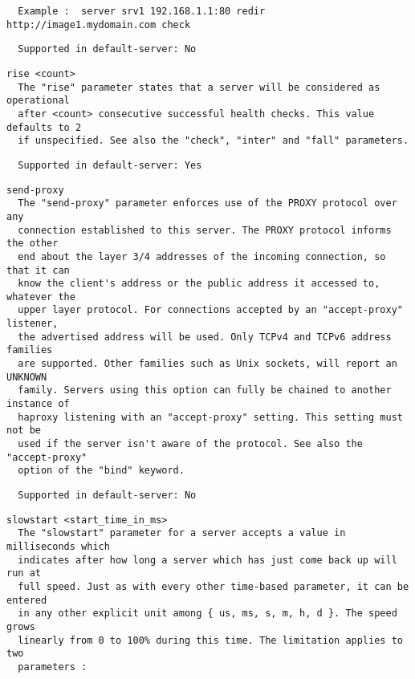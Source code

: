 \begin{verbatim}
  Example :  server srv1 192.168.1.1:80 redir http://image1.mydomain.com check
\end{verbatim}

\begin{verbatim}
  Supported in default-server: No
\end{verbatim}

\begin{verbatim}
rise <count>
  The "rise" parameter states that a server will be considered as operational
  after <count> consecutive successful health checks. This value defaults to 2
  if unspecified. See also the "check", "inter" and "fall" parameters.
\end{verbatim}

\begin{verbatim}
  Supported in default-server: Yes
\end{verbatim}

\begin{verbatim}
send-proxy
  The "send-proxy" parameter enforces use of the PROXY protocol over any
  connection established to this server. The PROXY protocol informs the other
  end about the layer 3/4 addresses of the incoming connection, so that it can
  know the client's address or the public address it accessed to, whatever the
  upper layer protocol. For connections accepted by an "accept-proxy" listener,
  the advertised address will be used. Only TCPv4 and TCPv6 address families
  are supported. Other families such as Unix sockets, will report an UNKNOWN
  family. Servers using this option can fully be chained to another instance of
  haproxy listening with an "accept-proxy" setting. This setting must not be
  used if the server isn't aware of the protocol. See also the "accept-proxy"
  option of the "bind" keyword.
\end{verbatim}

\begin{verbatim}
  Supported in default-server: No
\end{verbatim}

\begin{verbatim}
slowstart <start_time_in_ms>
  The "slowstart" parameter for a server accepts a value in milliseconds which
  indicates after how long a server which has just come back up will run at
  full speed. Just as with every other time-based parameter, it can be entered
  in any other explicit unit among { us, ms, s, m, h, d }. The speed grows
  linearly from 0 to 100% during this time. The limitation applies to two
  parameters :
\end{verbatim}

